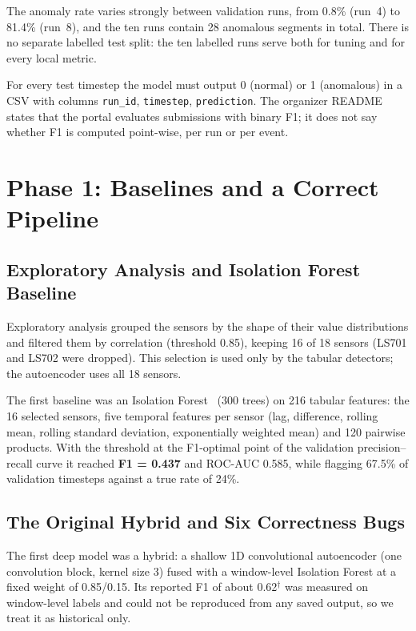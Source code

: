 \documentclass[runningheads]{llncs}
\newcommand{\doc}{$^\dagger$}
\begin{document}
The anomaly rate varies strongly between validation runs, from 0.8\% (run~4) to 81.4\% (run~8), and the ten runs contain 28 anomalous segments in total. There is no separate labelled test split: the ten labelled runs serve both for tuning and for every local metric.

For every test timestep the model must output 0 (normal) or 1 (anomalous) in a CSV with columns \texttt{run\_id}, \texttt{timestep}, \texttt{prediction}. The organizer README states that the portal evaluates submissions with binary F1; it does not say whether F1 is computed point-wise, per run or per event.

\section{Phase 1: Baselines and a Correct Pipeline}\label{sec:phase1}

\subsection{Exploratory Analysis and Isolation Forest Baseline}

Exploratory analysis grouped the sensors by the shape of their value distributions and filtered them by correlation (threshold 0.85), keeping 16 of 18 sensors (LS701 and LS702 were dropped). This selection is used only by the tabular detectors; the autoencoder uses all 18 sensors.

The first baseline was an Isolation Forest~\cite{liu2008isolation} (300 trees) on 216 tabular features: the 16 selected sensors, five temporal features per sensor (lag, difference, rolling mean, rolling standard deviation, exponentially weighted mean) and 120 pairwise products. With the threshold at the F1-optimal point of the validation precision--recall curve it reached \textbf{F1 = 0.437} and ROC-AUC 0.585, while flagging 67.5\% of validation timesteps against a true rate of 24\%.

\subsection{The Original Hybrid and Six Correctness Bugs}

The first deep model was a hybrid: a shallow 1D convolutional autoencoder (one convolution block, kernel size 3) fused with a window-level Isolation Forest at a fixed weight of 0.85/0.15. Its reported F1 of about 0.62\doc{} was measured on window-level labels and could not be reproduced from any saved output, so we treat it as historical only.
\end{document}
